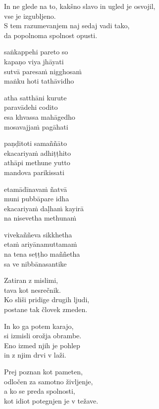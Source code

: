 In ne glede na to, kakšno slavo in ugled je osvojil,\\
vse je izgubljeno.\\
S tem razumevanjem naj sedaj vadi tako,\\
da popolnoma spolnost opusti.


\clearpage

saṅkappehi pareto so\\
kapaṇo viya jhāyati\\
sutvā paresaṁ nigghosaṁ\\
maṅku hoti tathāvidho

atha satthāni kurute\\
paravādehi codito\\
esa khvassa mahāgedho\\
mosavajjaṁ pagāhati

paṇḍitoti samaññāto\\
ekacariyaṁ adhiṭṭhito\\
athāpi methune yutto\\
mandova parikissati

etamādīnavaṁ ñatvā\\
muni pubbāpare idha\\
ekacariyaṁ daḷhaṁ kayirā\\
na nisevetha methunaṁ

vivekaññeva sikkhetha\\
etaṁ ariyānamuttamaṁ\\
na tena seṭṭho maññetha\\
sa ve nibbānasantike


\clearpage

Zatiran z mislimi,\\
tava kot nesrečnik.\\
Ko sliši pridige drugih ljudi,\\
postane tak človek zmeden.

In ko ga potem karajo,\\
si izmisli orožja obrambe.\\
Eno izmed njih je pohlep\\
in z njim drvi v laži.

Prej poznan kot pameten,\\
odločen za samotno življenje,\\
a ko se preda spolnosti,\\
kot idiot potegnjen je v težave.

